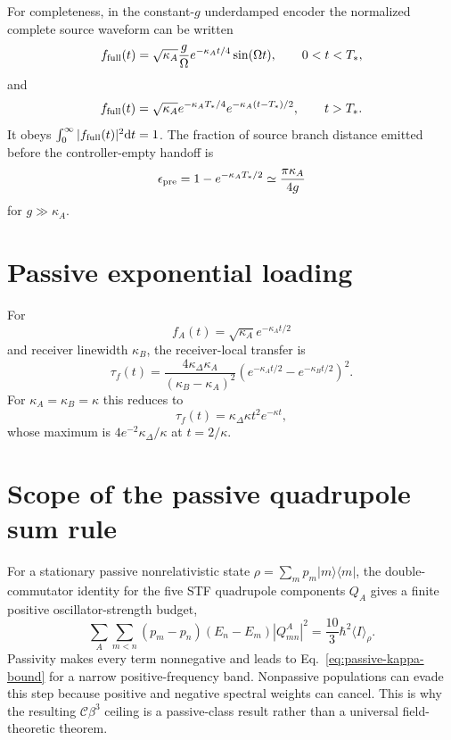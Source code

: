 \documentclass[11pt]{article}
\newcommand{\dd}{\mathrm{d}}
\begin{document}
For completeness, in the constant-$g$ underdamped encoder the normalized complete source waveform can be written
\begin{equation}
f_{\rm full}(t)
=\sqrt{\kappa_A}\frac{g}{\Omega}
 e^{-\kappa_A t/4}\sin(\Omega t),
\qquad0<t<T_*,
\end{equation}
and
\begin{equation}
f_{\rm full}(t)
=\sqrt{\kappa_A}
 e^{-\kappa_AT_*/4}
 e^{-\kappa_A(t-T_*)/2},
\qquad t>T_*.
\end{equation}
It obeys $\int_0^\infty|f_{\rm full}(t)|^2\dd t=1$. The fraction of source branch distance emitted before the controller-empty handoff is
\begin{equation}
\epsilon_{\rm pre}
=1-e^{-\kappa_AT_*/2}
\simeq\frac{\pi\kappa_A}{4g}
\end{equation}
for $g\gg\kappa_A$.

\section{Passive exponential loading}

For
\begin{equation}
f_A(t)=\sqrt{\kappa_A}e^{-\kappa_A t/2}
\end{equation}
and receiver linewidth $\kappa_B$, the receiver-local transfer is
\begin{equation}
\tau_f(t)
=\frac{4\kappa_\Delta\kappa_A}
{(\kappa_B-\kappa_A)^2}
\left(
 e^{-\kappa_A t/2}
-e^{-\kappa_Bt/2}
\right)^2.
\end{equation}
For $\kappa_A=\kappa_B=\kappa$ this reduces to
\begin{equation}
\tau_f(t)=\kappa_\Delta\kappa t^2e^{-\kappa t},
\end{equation}
whose maximum is $4e^{-2}\kappa_\Delta/\kappa$ at $t=2/\kappa$.

\section{Scope of the passive quadrupole sum rule}

For a stationary passive nonrelativistic state $\rho=\sum_m p_m|m\rangle\langle m|$, the double-commutator identity for the five STF quadrupole components $Q_A$ gives a finite positive oscillator-strength budget,
\begin{equation}
\sum_A\sum_{m<n}
(p_m-p_n)(E_n-E_m)|Q^A_{mn}|^2
=\frac{10}{3}\hbar^2\langle I\rangle_\rho.
\end{equation}
Passivity makes every term nonnegative and leads to Eq.~\eqref{eq:passive-kappa-bound} for a narrow positive-frequency band. Nonpassive populations can evade this step because positive and negative spectral weights can cancel. This is why the resulting $\mathcal C\beta^3$ ceiling is a passive-class result rather than a universal field-theoretic theorem.



\end{document}
